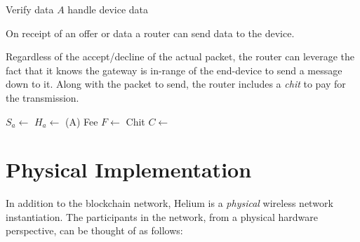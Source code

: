 \documentclass[10pt, nonatbib, nocopyrightspace, reprint]{sigplanconf}
\begin{document}
\begin{description}
\begin{algorithm}[!htb]
       {
        Verify data $A$ \;
        handle device data \;
      }
    \end{algorithm}
    \FloatBarrier


    \item [Send Data] On receipt of an offer or data a router can send data to the device.

      Regardless of the accept/decline of the actual packet, the router can leverage the fact that it knows the gateway is in-range of the end-device to send a message down to it. Along with the packet to send, the router includes a \emph{chit} to pay for the transmission.

    \begin{algorithm}[!htb]
      \DontPrintSemicolon
      \caption{Router Send Data }\label{proto:router.data.send}

       {
        $S_a \leftarrow $  \;
        $H_a \leftarrow $ \Hash(A) \;
        Fee $F \leftarrow $  \;
        Chit $C \leftarrow $  \;
         \;
      }
    \end{algorithm}
    \FloatBarrier


\end{description}

\section{Physical Implementation}

In addition to the blockchain network, Helium is a \emph{physical} wireless network instantiation. The participants in the network, from a physical hardware perspective, can be thought of as follows:
\end{document}
